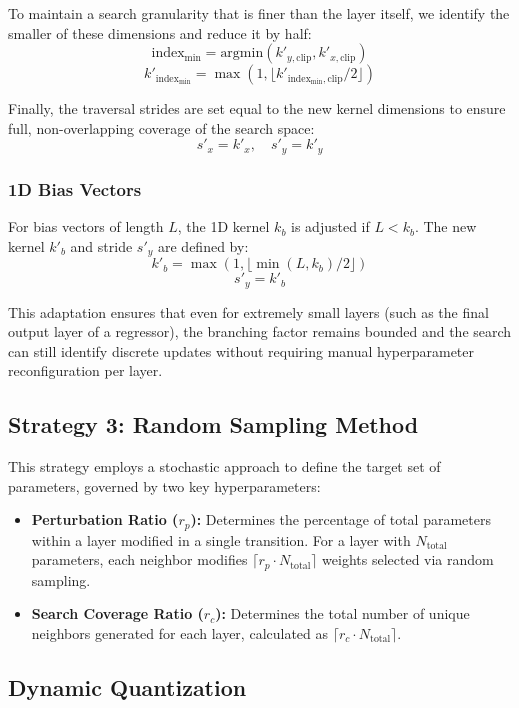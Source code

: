To maintain a search granularity that is finer than the layer itself, we identify the smaller of these dimensions and reduce it by half:
$$ \text{index}_{\min} = \text{argmin}(k'_{y, \text{clip}}, k'_{x, \text{clip}}) $$
$$ k'_{\text{index}_{\min}} = \max\left(1, \lfloor k'_{\text{index}_{\min}, \text{clip}} / 2 \rfloor\right) $$

Finally, the traversal strides are set equal to the new kernel dimensions to ensure full, non-overlapping coverage of the search space:
$$ s'_x = k'_x, \quad s'_y = k'_y $$

\subsubsection{1D Bias Vectors}
For bias vectors of length $L$, the 1D kernel $k_b$ is adjusted if $L < k_b$. The new kernel $k'_b$ and stride $s'_y$ are defined by:
$$ k'_b = \max\left(1, \lfloor \min(L, k_b) / 2 \rfloor\right) $$
$$ s'_y = k'_b $$

This adaptation ensures that even for extremely small layers (such as the final output layer of a regressor), the branching factor remains bounded and the search can still identify discrete updates without requiring manual hyperparameter reconfiguration per layer.

\subsection{Strategy 3: Random Sampling Method}
This strategy employs a stochastic approach to define the target set of parameters, governed by two key hyperparameters:
\begin{itemize}
    \item \textbf{Perturbation Ratio ($r_p$):} Determines the percentage of total parameters within a layer modified in a single transition. For a layer with $N_{\text{total}}$ parameters, each neighbor modifies $\lceil r_p \cdot N_{\text{total}} \rceil$ weights selected via random sampling.
    \item \textbf{Search Coverage Ratio ($r_c$):} Determines the total number of unique neighbors generated for each layer, calculated as $\lceil r_c \cdot N_{\text{total}} \rceil$.
\end{itemize}





\subsection{Dynamic Quantization}
\label{subsec:dynamic_quantization}

